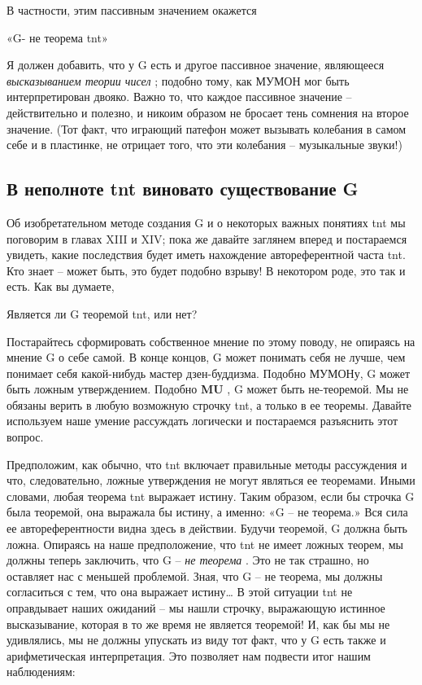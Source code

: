 \documentclass[../main.tex]{subfiles}
\begin{document}
В частности, этим пассивным значением окажется

«G- не теорема \acs{tnt}»

Я должен добавить, что у G есть и другое пассивное значение, являющееся \emph{высказыванием теории чисел} ; подобно тому, как МУМОН мог быть интерпретирован двояко. Важно то, что каждое пассивное значение \--- действительно и полезно, и никоим образом не бросает тень сомнения на второе значение. (Тот факт, что играющий патефон может вызывать колебания в самом себе и в пластинке, не отрицает того, что эти колебания \--- музыкальные звуки!)


\subsection{В неполноте \acs{tnt} виновато существование G}

Об изобретательном методе создания G и о некоторых важных понятиях \acs{tnt} мы поговорим в главах XIII и XIV; пока же давайте заглянем вперед и постараемся увидеть, какие последствия будет иметь нахождение автореферентной часта \acs{tnt}\@. Кто знает \--- может быть, это будет подобно взрыву! В некотором роде, это так и есть. Как вы думаете,

Является ли G теоремой \acs{tnt}, или нет?

Постарайтесь сформировать собственное мнение по этому поводу, не опираясь на мнение G о себе самой. В конце концов, G может понимать себя не лучше, чем понимает себя какой-нибудь мастер дзен-буддизма. Подобно МУМОНу, G может быть ложным утверждением. Подобно \textbf{MU} , G может быть не-теоремой. Мы не обязаны верить в любую возможную строчку \acs{tnt}, а только в ее теоремы. Давайте используем наше умение рассуждать логически и постараемся разъяснить этот вопрос.

Предположим, как обычно, что \acs{tnt} включает правильные методы рассуждения и что, следовательно, ложные утверждения не могут являться ее теоремами. Иными словами, любая теорема \acs{tnt} выражает истину. Таким образом, если бы строчка G была теоремой, она выражала бы истину, а именно: «G \--- не теорема.» Вся сила ее автореферентности видна здесь в действии. Будучи теоремой, G должна быть ложна. Опираясь на наше предположение, что \acs{tnt} не имеет ложных теорем, мы должны теперь заключить, что G \--- \emph{не теорема} . Это не так страшно, но оставляет нас с меньшей проблемой. Зная, что G \--- не теорема, мы должны согласиться с тем, что она выражает истину\ldots{} В этой ситуации \acs{tnt} не оправдывает наших ожиданий \--- мы нашли строчку, выражающую истинное высказывание, которая в то же время не является теоремой! И, как бы мы не удивлялись, мы не должны упускать из виду тот факт, что у G есть также и арифметическая интерпретация. Это позволяет нам подвести итог нашим наблюдениям:
\end{document}
